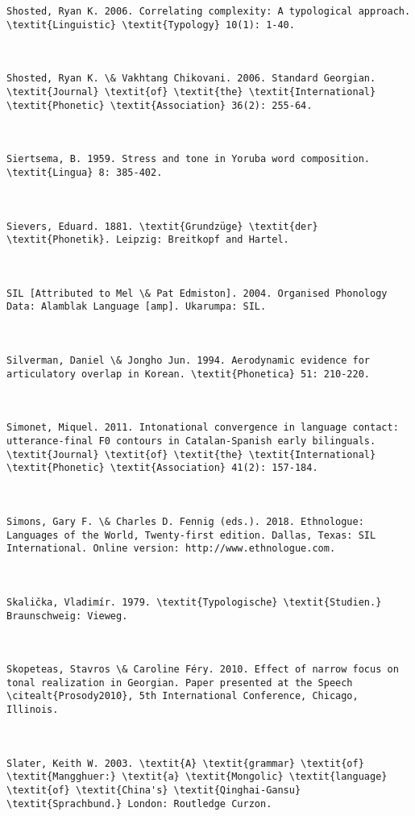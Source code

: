 \begin{verbatim}
Shosted, Ryan K. 2006. Correlating complexity: A typological approach. \textit{Linguistic} \textit{Typology} 10(1): 1-40.



Shosted, Ryan K. \& Vakhtang Chikovani. 2006. Standard Georgian. \textit{Journal} \textit{of} \textit{the} \textit{International} \textit{Phonetic} \textit{Association} 36(2): 255-64.



Siertsema, B. 1959. Stress and tone in Yoruba word composition. \textit{Lingua} 8: 385-402.



Sievers, Eduard. 1881. \textit{Grundzüge} \textit{der} \textit{Phonetik}. Leipzig: Breitkopf and Hartel.



SIL [Attributed to Mel \& Pat Edmiston]. 2004. Organised Phonology Data: Alamblak Language [amp]. Ukarumpa: SIL.



Silverman, Daniel \& Jongho Jun. 1994. Aerodynamic evidence for articulatory overlap in Korean. \textit{Phonetica} 51: 210-220.



Simonet, Miquel. 2011. Intonational convergence in language contact: utterance-final F0 contours in Catalan-Spanish early bilinguals. \textit{Journal} \textit{of} \textit{the} \textit{International} \textit{Phonetic} \textit{Association} 41(2): 157-184.



Simons, Gary F. \& Charles D. Fennig (eds.). 2018. Ethnologue: Languages of the World, Twenty-first edition. Dallas, Texas: SIL International. Online version: http://www.ethnologue.com.



Skalička, Vladimír. 1979. \textit{Typologische} \textit{Studien.} Braunschweig: Vieweg. 



Skopeteas, Stavros \& Caroline Féry. 2010. Effect of narrow focus on tonal realization in Georgian. Paper presented at the Speech \citealt{Prosody2010}, 5th International Conference, Chicago, Illinois.



Slater, Keith W. 2003. \textit{A} \textit{grammar} \textit{of} \textit{Mangghuer:} \textit{a} \textit{Mongolic} \textit{language} \textit{of} \textit{China's} \textit{Qinghai-Gansu} \textit{Sprachbund.} London: Routledge Curzon.




\end{verbatim}
